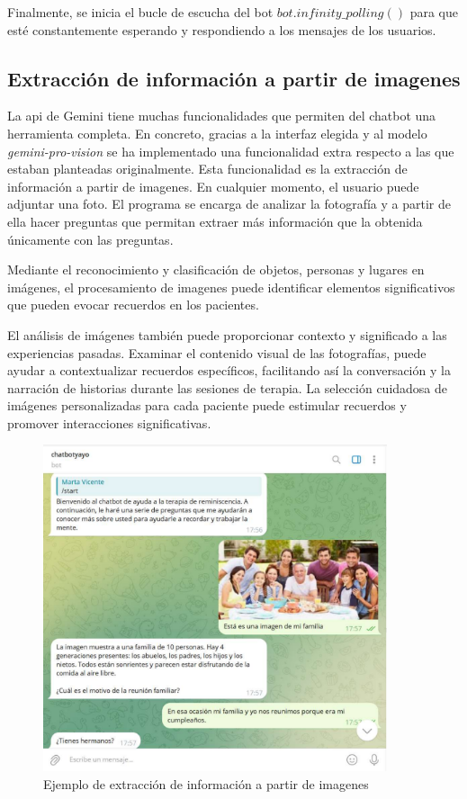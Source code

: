 Finalmente, se inicia el bucle de escucha del bot $bot.infinity\_polling()$ para que esté constantemente esperando y respondiendo a los mensajes de los usuarios.


\subsection{Extracción de información a partir de imagenes}
\label{sec:imagenes}
La api de Gemini tiene muchas funcionalidades que permiten del chatbot una herramienta completa. En concreto, gracias a la interfaz elegida y al modelo \textit{gemini-pro-vision} se ha implementado una funcionalidad extra respecto a las que estaban planteadas originalmente. Esta funcionalidad es la extracción de información a partir de imagenes. En cualquier momento, el usuario puede adjuntar una foto. El programa se encarga de analizar la fotografía y a partir de ella hacer preguntas que permitan extraer más información que la obtenida únicamente con las preguntas.

Mediante el reconocimiento y clasificación de objetos, personas y lugares en imágenes, el procesamiento de imagenes puede identificar elementos significativos que pueden evocar recuerdos en los pacientes. 

El análisis de imágenes también puede proporcionar contexto y significado a las experiencias pasadas. Examinar el contenido visual de las fotografías, puede ayudar a contextualizar recuerdos específicos, facilitando así la conversación y la narración de historias durante las sesiones de terapia. La selección cuidadosa de imágenes personalizadas para cada paciente puede estimular recuerdos y promover interacciones significativas. 

\begin{figure}[h]
	\centering
	\includegraphics[width=0.9\textwidth]{Imagenes/extracInfoImag}
	\caption{Ejemplo de extracción de información a partir de imagenes}
\end{figure}

